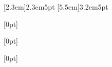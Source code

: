 

\usepackage{booktabs}
\usepackage{tabularx}
\usepackage{titletoc}%
\usepackage{tocloft} %
\usepackage[font=small]{caption}

\contentsmargin{0pt}
\renewcommand\contentspage{\thecontentspage}

[2.3em]{}{2.3em}{5pt}
[5.5em]{}{3.2em}{5pt}


  [0pt]%
  {}%
  {\bfseries\chaptername\ \thecontentslabel\quad}%
  {}%
  {\bfseries\dotfill\contentspage\\\vspace{0mm}}%

  [0pt]%
  {}%
  {\bfseries\ \thecontentslabel\quad}%
  {}%
  {\bfseries\dotfill\contentspage\\\vspace{0mm}}%
  
  [0pt]%
  {}%
  {\hspace{2mm}\bfseries\ \thecontentslabel\quad}%
  {}%
  {\bfseries\dotfill\contentspage\\\vspace{0mm}}%

\newcommand*{\noaddvspace}{\renewcommand*{\addvspace}[1]{}}
\addtocontents{lof}{\protect\noaddvspace}
\addtocontents{lot}{\protect\noaddvspace}

\usepackage{fontspec}
\newfontfamily{}
\newcommand{\zh}[1]{{\chinesefont #1}}

\usepackage{mfirstuc}

\usepackage{graphicx}
\graphicspath{ {Images/} }
\usepackage{caption}
\usepackage{subcaption}

\usepackage[a4paper,top=2.54cm,bottom=2.54cm, left=3cm, right=3cm]{geometry}



